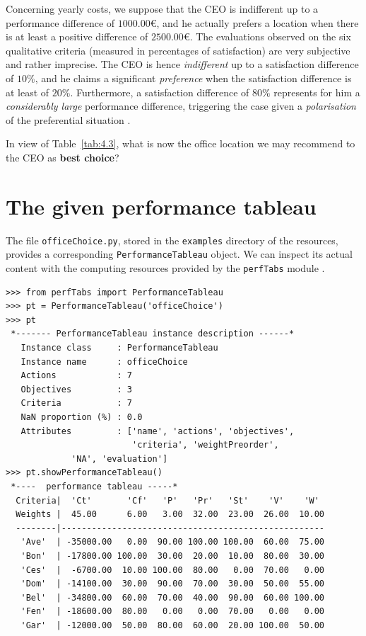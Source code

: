 Concerning yearly costs, we suppose that the CEO is indifferent up to a performance difference of $1000.00$€, and he actually prefers a location when there is at least a positive difference of $2500.00$€. The evaluations observed on the six qualitative criteria (measured in percentages of satisfaction) are very subjective and rather imprecise. The CEO is hence \emph{indifferent} up to a satisfaction difference of $10\%$, and he claims a significant \emph{preference} when the satisfaction difference is at least of $20\%$.  Furthermore, a satisfaction difference of $80\%$ represents for him a \emph{considerably large} performance difference, triggering the case given a \emph{polarisation} of the preferential situation \citep{BIS-2013}. 

In view of Table~\vref{tab:4.3}, what is now the office location we may recommend to the CEO as \textbf{best choice}?

\section{The given performance tableau}
\label{sec:4.2}


The file \texttt{officeChoice.py}, stored in the \texttt{examples} directory of the \Digraph resources, provides a corresponding \texttt{PerformanceTableau} object. We can inspect its actual content with the computing resources provided by the \texttt{perfTabs} module .
\begin{lstlisting}[caption={Inspecting the \texttt{officeChoice} performance tableau.},label=list:4.1]
>>> from perfTabs import PerformanceTableau
>>> pt = PerformanceTableau('officeChoice')
>>> pt
 *------- PerformanceTableau instance description ------*
   Instance class     : PerformanceTableau
   Instance name      : officeChoice
   Actions            : 7
   Objectives         : 3
   Criteria           : 7
   NaN proportion (%) : 0.0
   Attributes         : ['name', 'actions', 'objectives',
                         'criteria', 'weightPreorder',
			 'NA', 'evaluation']
>>> pt.showPerformanceTableau()
 *----  performance tableau -----*
  Criteria|  'Ct'       'Cf'   'P'   'Pr'   'St'    'V'    'W'   
  Weights |  45.00      6.00   3.00  32.00  23.00  26.00  10.00    
  --------|----------------------------------------------------
   'Ave'  | -35000.00   0.00  90.00 100.00 100.00  60.00  75.00  
   'Bon'  | -17800.00 100.00  30.00  20.00  10.00  80.00  30.00  
   'Ces'  |  -6700.00  10.00 100.00  80.00   0.00  70.00   0.00  
   'Dom'  | -14100.00  30.00  90.00  70.00  30.00  50.00  55.00  
   'Bel'  | -34800.00  60.00  70.00  40.00  90.00  60.00 100.00  
   'Fen'  | -18600.00  80.00   0.00   0.00  70.00   0.00   0.00  
   'Gar'  | -12000.00  50.00  80.00  60.00  20.00 100.00  50.00  
\end{lstlisting}

